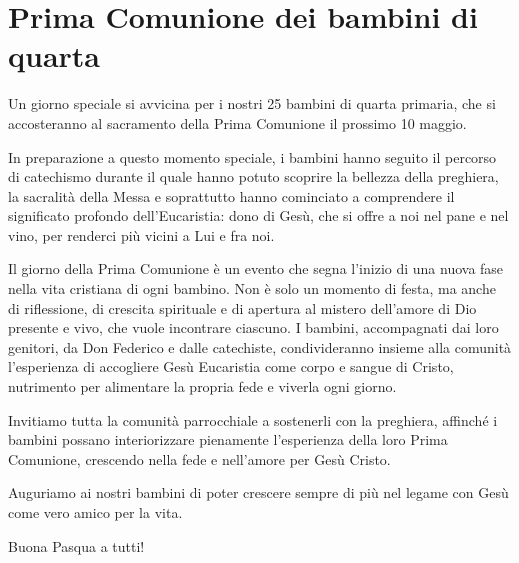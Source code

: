 \section{Prima Comunione dei bambini di quarta}

Un giorno speciale si avvicina per i nostri 25 bambini di quarta primaria, che si accosteranno al sacramento della Prima Comunione il prossimo 10 maggio.

In preparazione a questo momento speciale, i bambini hanno seguito il percorso di catechismo durante il quale hanno potuto scoprire la bellezza della preghiera, la sacralità della Messa e soprattutto hanno cominciato a comprendere il significato profondo dell'Eucaristia: dono di Gesù, che si offre a noi nel pane e nel vino, per renderci più vicini a Lui e fra noi.

Il giorno della Prima Comunione è un evento che segna l'inizio di una nuova fase nella vita cristiana di ogni bambino. Non è solo un momento di festa, ma anche di riflessione, di crescita spirituale e di apertura al mistero dell'amore di Dio presente e vivo, che vuole incontrare ciascuno. I bambini, accompagnati dai loro genitori, da Don Federico e dalle catechiste, condivideranno insieme alla comunità l'esperienza di accogliere Gesù Eucaristia come corpo e sangue di Cristo, nutrimento per alimentare la propria fede e viverla ogni giorno.

Invitiamo tutta la comunità parrocchiale a sostenerli con la preghiera, affinché i bambini possano interiorizzare pienamente l'esperienza della loro Prima Comunione, crescendo nella fede e nell'amore per Gesù Cristo.

Auguriamo ai nostri bambini di poter crescere sempre di più nel legame con Gesù come vero amico per la vita.

Buona Pasqua a tutti!




